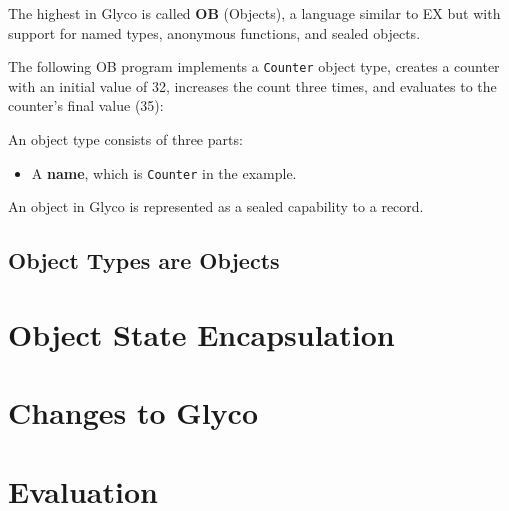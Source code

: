 \documentclass[main.tex]{subfiles}
\begin{document}
The highest  in Glyco is called \textbf{OB} (Objects), a language similar to EX but with support for named types, anonymous functions, and sealed objects.

The following OB program implements a \texttt{Counter} object type, creates a counter with an initial value of 32, increases the count three times, and evaluates to the counter's final value (35):

An object type consists of three parts:
\begin{itemize}
    \item A \textbf{name}, which is \texttt{Counter} in the example.
\end{itemize}

An object in Glyco is represented as a sealed capability to a record.

\subsection{Object Types are Objects}

\section{Object State Encapsulation} \label{sct:obj-sec}

\section{Changes to Glyco} \label{sct:obj-changes}

\section{Evaluation} \label{sct:obj-eval}

\onlyinsubfile{\glsaddall\printglossaries}
\end{document}
